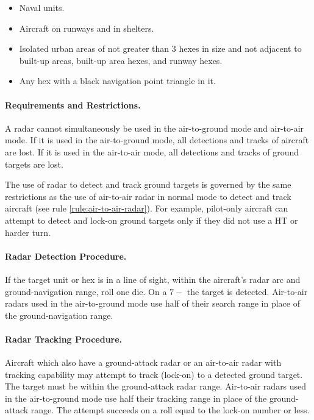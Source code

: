 \begin{advancedrules}
{\begin{itemize}
    \item Naval units.

    \item Aircraft on runways and in shelters.

    \item Isolated urban areas of not greater than 3 hexes in size and not adjacent to built-up areas, built-up area hexes, and runway hexes.
    
    \item Any hex with a black navigation point triangle in it.

\end{itemize}

\paragraph{Requirements and Restrictions.} A radar cannot simultaneously be used in the air-to-ground mode and air-to-air mode. If it is used in the air-to-ground mode, all detections and tracks of aircraft are lost. If it is used in the air-to-air mode, all detections and tracks of ground targets are lost. 

The use of radar to detect and track ground targets is governed by the same restrictions as the use of air-to-air radar in normal mode to detect and track aircraft (see rule \ref{rule:air-to-air-radar}). For example, pilot-only aircraft can attempt to detect and lock-on ground targets only if they did not use a HT or harder turn.

\paragraph{Radar Detection Procedure.} If the target unit or hex is in a line of sight, within the aircraft's radar arc and ground-navigation range, roll one die. On a $7-$ the target is detected. Air-to-air radars used in the air-to-ground mode use half of their search range in place of the ground-navigation range.

\paragraph{Radar Tracking Procedure.} Aircraft which also have a ground-attack radar or an air-to-air radar with tracking capability may attempt to track (lock-on) to a detected ground target. The target must be within the ground-attack radar range. Air-to-air radars used in the air-to-ground mode use half their tracking range in place of the ground-attack range. The attempt succeeds on a roll equal to the lock-on number or less.

}
\end{advancedrules}
